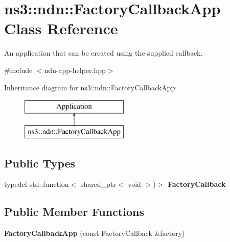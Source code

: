 \hypertarget{classns3_1_1ndn_1_1FactoryCallbackApp}{}\section{ns3\+:\+:ndn\+:\+:Factory\+Callback\+App Class Reference}
\label{classns3_1_1ndn_1_1FactoryCallbackApp}


An application that can be created using the supplied callback.  




{\ttfamily \#include $<$ndn-\/app-\/helper.\+hpp$>$}

Inheritance diagram for ns3\+:\+:ndn\+:\+:Factory\+Callback\+App\+:\begin{figure}[H]
\begin{center}
\leavevmode
\includegraphics[height=2.000000cm]{classns3_1_1ndn_1_1FactoryCallbackApp}
\end{center}
\end{figure}
\subsection*{Public Types}
\begin{DoxyCompactItemize}
\item 
typedef std\+::function$<$ shared\+\_\+ptr$<$ void $>$)$>$ {\bfseries Factory\+Callback}\hypertarget{classns3_1_1ndn_1_1FactoryCallbackApp_a320aa07f7095f58ffa413ab0d74aeeb2}{}\label{classns3_1_1ndn_1_1FactoryCallbackApp_a320aa07f7095f58ffa413ab0d74aeeb2}

\end{DoxyCompactItemize}
\subsection*{Public Member Functions}
\begin{DoxyCompactItemize}
\item 
{\bfseries Factory\+Callback\+App} (const Factory\+Callback \&factory)\hypertarget{classns3_1_1ndn_1_1FactoryCallbackApp_aff0950e210327850c69a4b5f378e3aa4}{}\label{classns3_1_1ndn_1_1FactoryCallbackApp_aff0950e210327850c69a4b5f378e3aa4}

\end{DoxyCompactItemize}
